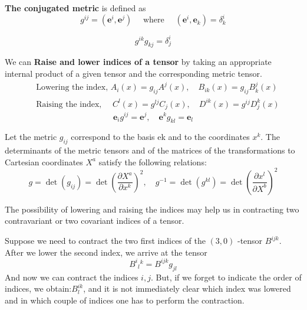 \textbf{The conjugated metric} is defined as
\begin{equation}
g^{i j}=\left(\mathbf{e}^{i}, \mathbf{e}^{j}\right) \quad \text { where } \quad\left(\mathbf{e}^{i}, \mathbf{e}_{k}\right)=\delta_{k}^{i}
\end{equation}
\begin{qt}
\begin{equation}
g^{i k} g_{k j}=\delta_{j}^{i}
\end{equation}
\end{qt}

We can\textbf{ Raise and lower indices of a tensor} by taking an appropriate internal product of a given tensor and the corresponding metric tensor.
\begin{equation}
\begin{aligned}
&\text { Lowering the index, } A_{i}(x)=g_{i j} A^{j}(x), \quad B_{i k}(x)=g_{i j} B_{ k}^{j}(x)\\
&\text { Raising the index, } \quad C^{l}(x)=g^{l j} C_{j}(x), \quad D^{i k}(x)=g^{i j} D_{j}^{k}(x)
\end{aligned}
\end{equation}
\begin{equation}
    \mathbf{e}_{i} g^{i j}=\mathbf{e}^{j}, \quad \mathbf{e}^{k} g_{k l}=\mathbf{e}_{l}
\end{equation}
\begin{qt}
Let the metric $g_{ij}$ correspond to the basis ek and to the coordinates $x^{k} .$ The determinants of the metric tensors and of the matrices of the transformations to Cartesian coordinates $X^{a}$ satisfy the following relations:
\begin{equation}
g=\operatorname{det}\left(g_{i j}\right)=\operatorname{det}\left(\frac{\partial X^{a}}{\partial x^{k}}\right)^{2}, \quad g^{-1}=\operatorname{det}\left(g^{k l}\right)=\operatorname{det}\left(\frac{\partial x^{l}}{\partial X^{b}}\right)^{2}
\end{equation}
\end{qt}
The possibility of lowering and raising the indices may help us in contracting two contravariant or two covariant indices of a tensor. 
\begin{example}
Suppose we need to contract the two first indices of the $(3,0)$ -tensor $B^{i j k} .$ After we lower the second index, we arrive at the tensor
$$
B^i{}_{l}{}^{k}=B^{i j k} g_{j l}
$$
And now we can contract the indices $i,j$. But, if we forget to indicate the order of indices, we obtain:$B_{l}^{i k}$, and it is not immediately clear which index was lowered and in which couple of indices one has to perform the contraction.
\end{example}

